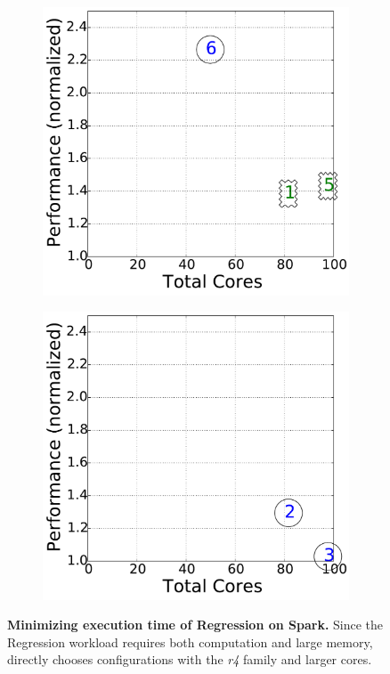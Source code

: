 \begin{figure}[!htbp]
\centering
\begin{subfigure}[b]{0.4\textwidth}
    \includegraphics[width=\linewidth]{figures/multiple_bo_time_spark1.5.regression.huge_12_cores.pdf}
    \caption{\cherrypick}
    \label{fig:search_time_cherrypick}
\end{subfigure}
\begin{subfigure}[b]{0.4\textwidth}
    \includegraphics[width=\linewidth]{figures/multiple_scout_time_spark1.5.regression.huge_24_m4.large_cores.pdf}
    \caption{\scout}
    \label{fig:search_time_scout}
\end{subfigure}
\caption{\small{\textbf{Minimizing execution time of Regression on Spark.} Since the Regression workload requires both computation and large memory, \scout directly chooses configurations with the \emph{r4} family and larger cores.}}
\label{fig:compare_2}
\end{figure}

